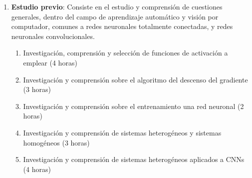 \begin{enumerate}[label=\textbullet]
	\item \textbf{Estudio previo}: Consiste en el estudio y comprensión de cuestiones generales, dentro del campo de aprendizaje automático y visión por computador, comunes a redes neuronales totalmente conectadas, y redes neuronales convolucionales.
	\begin{enumerate}[label=\textbullet]
		\item Investigación, comprensión y selección de funciones de activación a emplear (4 horas)
		\item Investigación y comprensión sobre el algoritmo del descenso del gradiente (3 horas)
		\item Investigación y comprensión sobre el entrenamiento una red neuronal (2 horas)
		\item Investigación y comprensión de sistemas heterogéneos y sistemas homogéneos (3 horas)
		\item Investigación y comprensión de sistemas heterogéneos aplicados a CNNs (4 horas)
	\end{enumerate}
	

\end{enumerate}
